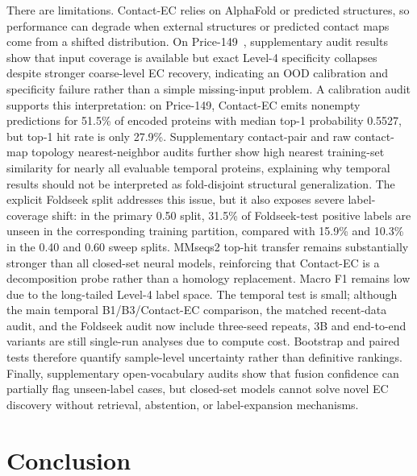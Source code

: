 \documentclass[namedate,contemporary,mediumone]{oup-authoring-template}
\begin{document}
There are limitations. Contact-EC relies on AlphaFold or predicted structures, so
performance can degrade when external structures or predicted contact maps come
from a shifted distribution. On Price-149~\citep{price2018}, supplementary audit results show that
input coverage is available but exact Level-4 specificity collapses despite
stronger coarse-level EC recovery, indicating an OOD calibration and specificity
failure rather than a simple missing-input problem. A calibration audit supports
this interpretation: on Price-149, Contact-EC emits nonempty predictions for
51.5\% of encoded proteins with median top-1 probability 0.5527, but top-1
hit rate is only 27.9\%. Supplementary contact-pair and raw contact-map topology
nearest-neighbor audits further show high nearest training-set similarity for
nearly all evaluable temporal proteins, explaining why temporal results should
not be interpreted as fold-disjoint structural generalization. The explicit
Foldseek split addresses this issue, but it also exposes severe label-coverage
shift: in the primary 0.50 split, 31.5\% of Foldseek-test positive labels are
unseen in the corresponding training partition, compared with 15.9\% and 10.3\%
in the 0.40 and 0.60 sweep splits. MMseqs2 top-hit transfer remains
substantially stronger than all closed-set neural models, reinforcing that
Contact-EC is a decomposition probe rather than a homology replacement. Macro F1 remains low due to the long-tailed Level-4 label
space. The temporal test is small; although the main temporal B1/B3/Contact-EC
comparison, the matched recent-data audit, and the Foldseek audit now include
three-seed repeats, 3B and end-to-end variants are still single-run analyses due
to compute cost. Bootstrap and
paired tests therefore quantify sample-level uncertainty rather than definitive
rankings. Finally, supplementary open-vocabulary audits show that fusion confidence
can partially flag unseen-label cases, but closed-set models cannot solve novel EC
discovery without retrieval, abstention, or label-expansion mechanisms.

\section{Conclusion}
\end{document}

